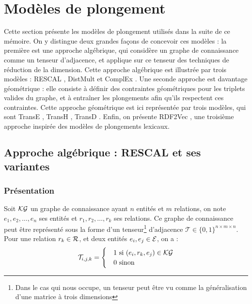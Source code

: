 \section{Modèles de plongement}
\label{sec:kge-models}

Cette section présente les modèles de plongement utilisés dans la suite de ce mémoire. On y distingue deux grandes façons de concevoir ces modèles : la première est une approche algébrique, qui considère un graphe de connaissance comme un tenseur d'adjacence, et applique sur ce tenseur des techniques de réduction de la dimension. %
Cette approche algébrique est illustrée par trois modèles : RESCAL \cite{rescal}, DistMult \cite{distmult} et ComplEx \cite{complex}. Une seconde approche est davantage géométrique : elle consiste à définir des contraintes géométriques pour les triplets valides du graphe, et à entraîner les plongements afin qu'ils respectent ces contraintes. %
Cette approche géométrique est ici représentée par trois modèles, qui sont TransE \cite{bordes2013translating}, TransH \cite{transh}, TransD \cite{transd}. 
Enfin, on présente RDF2Vec \cite{ristoski2016rdf2vec}, une troisième approche inspirée des modèles de plongements lexicaux.


\subsection{Approche algébrique : RESCAL et ses variantes}
\label{subsec:kge-models-mult}

\subsubsection{Présentation}


Soit $\mathcal{KG}$ un graphe de connaissance ayant $n$ entités et $m$ relations, on note $e_1, e_2, \ldots, e_n$ ses entités et $r_1, r_2, \ldots, r_k$ ses relations. Ce graphe de connaissance peut être représenté sous la forme d'un tenseur\footnote{Dans le cas qui nous occupe, un tenseur peut être vu comme la généralisation d'une matrice à trois dimensions} d'adjacence $\mathcal{T} \in \{0, 1\}^{n \times m \times n}$. Pour une relation $r_k \in \mathcal{R}$, et deux entités $e_i, e_j \in \mathcal{E}$, on a :
\begin{equation}
    \mathcal{T}_{i, j, k} = \begin{cases}
    &1 \text{ si } (e_i, r_k, e_j) \in \mathcal{KG} \\
    &0 \text{ sinon}
    \end{cases}
\end{equation}

